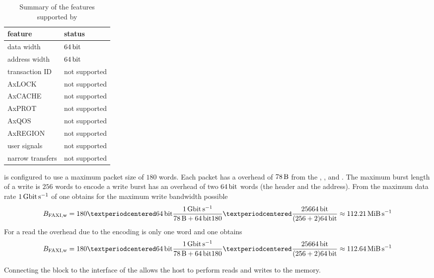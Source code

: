 \begin{table}
  \begin{center}
\begin{tabular}{ll}
  \toprule
  feature & status  \\
  \midrule
  data width & $\SI{64}{\bit}$ \\
  address width & $\SI{64}{\bit}$ \\
  transaction ID & not supported \\
  AxLOCK & not supported \\
  AxCACHE & not supported \\
  AxPROT & not supported \\
  AxQOS & not supported \\
  AxREGION & not supported \\
  user signals & not supported \\
  narrow transfers & not supported \\
  \bottomrule
\end{tabular}

  \end{center}
\caption{Summary of the \AXI{} features supported by \FAXI{}}\label{tbl:faxi_axi_features}
\end{table}

\HostARQ{} is configured to use a maximum packet size of $\num{180}$ \PhyWordSize{} words.
Each packet has a overhead of $\SI{78}{\byte}$ from the \Ethernet{}, , \UDP{} and \HostARQ{}.
The maximum burst length of a \AXI{} write is $\num{256}$ words to encode a write burst \FAXI{} has an overhead of two $\PhyWordSize{}$ words (the header and the address). From the maximum data rate $\SI{1}{\giga\bit\per\second}$ of \Gigabitethernet{} one obtains for the maximum write bandwidth possible
\[
B_{\text{\FAXI{},w}} = \num{180} · \PhyWordSize{} \frac{\SI{1}{\giga\bit\per\second}}{\SI{78}{\byte} + \PhyWordSize{} {180}} · \frac{256 \PhyWordSize{}}{(256 + 2) \PhyWordSize{}} \approx \SI{112.21}{\mebi\byte\per\second}
\]
For a read the overhead due to the \FAXI{} encoding is only one \PhyWordSize{} word and one obtains
\[
B_{\text{\FAXI{},w}} = \num{180} · \PhyWordSize{} \frac{\SI{1}{\giga\bit\per\second}}{\SI{78}{\byte} + \PhyWordSize{} {180}} · \frac{256 \PhyWordSize{}}{(256 + 2) \PhyWordSize{}} \approx \SI{112.64}{\mebi\byte\per\second}
\]

Connecting the \FAXI{} block to the \AXI{} interface of the \XilinxMIG{} allows the host to perform reads and writes to the \DDR{} memory.

